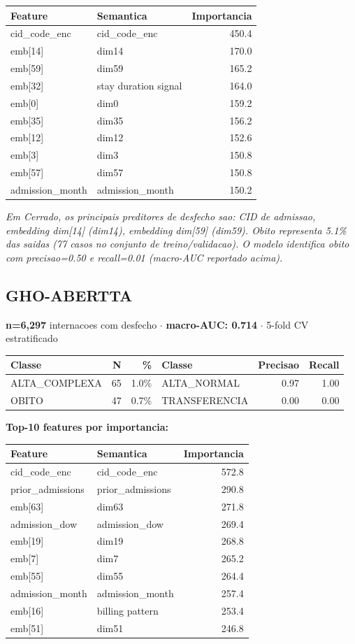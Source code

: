 \documentclass[11pt,a4paper]{article}
\begin{document}
\begin{tabular}{llr}
\toprule
Feature & Semantica & Importancia \\
\midrule
cid\_code\_enc & cid\_code\_enc & 450.4 \\
emb[14] & dim14 & 170.0 \\
emb[59] & dim59 & 165.2 \\
emb[32] & stay duration signal & 164.0 \\
emb[0] & dim0 & 159.2 \\
emb[35] & dim35 & 156.2 \\
emb[12] & dim12 & 152.6 \\
emb[3] & dim3 & 150.8 \\
emb[57] & dim57 & 150.8 \\
admission\_month & admission\_month & 150.2 \\
\bottomrule
\end{tabular}

\vspace{4pt}\noindent\textit{Em Cerrado, os principais preditores de desfecho sao: CID de admissao, embedding dim[14] (dim14), embedding dim[59] (dim59). Obito representa 5.1\% das saidas (77 casos no conjunto de treino/validacao). O modelo identifica obito com precisao=0.50 e recall=0.01 (macro-AUC reportado acima).}

\subsection{GHO-ABERTTA}
\textbf{n=6,297} internacoes com desfecho $\cdot$ \textbf{macro-AUC: 0.714} $\cdot$ 5-fold CV estratificado

\begin{tabular}{lrr|lrr}
\toprule
Classe & N & \% & Classe & Precisao & Recall \\
\midrule
ALTA\_COMPLEXA & 65 & 1.0\% & ALTA\_NORMAL & 0.97 & 1.00 \\
OBITO & 47 & 0.7\% & TRANSFERENCIA & 0.00 & 0.00 \\
\bottomrule
\end{tabular}

\vspace{4pt}\noindent\textbf{Top-10 features por importancia:}

\begin{tabular}{llr}
\toprule
Feature & Semantica & Importancia \\
\midrule
cid\_code\_enc & cid\_code\_enc & 572.8 \\
prior\_admissions & prior\_admissions & 290.8 \\
emb[63] & dim63 & 271.8 \\
admission\_dow & admission\_dow & 269.4 \\
emb[19] & dim19 & 268.8 \\
emb[7] & dim7 & 265.2 \\
emb[55] & dim55 & 264.4 \\
admission\_month & admission\_month & 257.4 \\
emb[16] & billing pattern & 253.4 \\
emb[51] & dim51 & 246.8 \\
\bottomrule
\end{tabular}
\end{document}
